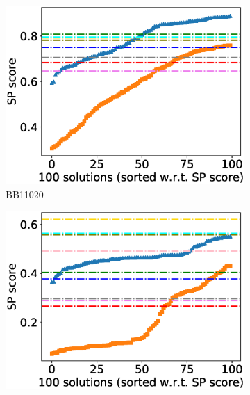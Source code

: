 \begin{figure}[!htbp]
\begin{adjustwidth}{-1cm}{-1cm}
\begin{subfigure}{0.26\textwidth}
			\includegraphics[width=\columnwidth]{Figure/summary/precomputedInit/Balibase/BB11020_pairs_density_single_run_2}
			\caption{BB11020}
		\end{subfigure}
		\begin{subfigure}{0.26\textwidth}
			\includegraphics[width=\columnwidth]{Figure/summary/precomputedInit/Balibase/BB11033_pairs_density_single_run_2}

\end{subfigure}
\end{adjustwidth}
\end{figure}
